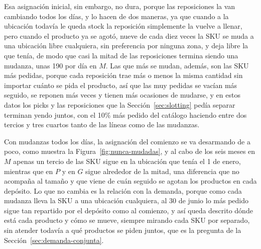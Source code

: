 Esa asignación inicial, sin embargo, no dura, porque las reposiciones la van cambiando todos los días, y lo hacen de dos maneras, ya que cuando a la ubicación todavía le queda stock la reposición simplemente la vuelve a llenar, pero cuando el producto ya se agotó, nueve de cada diez veces la SKU se muda a una ubicación libre cualquiera, sin preferencia por ninguna zona, y deja libre la que tenía, de modo que casi la mitad de las reposiciones termina siendo una mudanza, unas 190 por día en $M$.
Las que más se mudan, además, son las SKU más pedidas, porque cada reposición trae más o menos la misma cantidad sin importar cuánto se pida el producto, así que las muy pedidas se vacían más seguido, se reponen más veces y tienen más ocasiones de mudarse, y en estos datos los picks y las reposiciones que la Sección~\ref{sec:slotting} pedía separar terminan yendo juntos, con el 10\% más pedido del catálogo haciendo entre dos tercios y tres cuartos tanto de las líneas como de las mudanzas.

Con mudanzas todos los días, la asignación del comienzo se va desarmando de a poco, como muestra la Figura~\ref{fig:nunca-mudadas}, y al cabo de los seis meses en $M$ apenas un tercio de las SKU sigue en la ubicación que tenía el 1 de enero, mientras que en $P$ y en $G$ sigue alrededor de la mitad, una diferencia que no acompaña al tamaño y que viene de cuán seguido se agotan los productos en cada depósito.
Lo que no cambia es la relación con la demanda, porque como cada mudanza lleva la SKU a una ubicación cualquiera, al 30 de junio lo más pedido sigue tan repartido por el depósito como al comienzo, y así queda descrito dónde está cada producto y cómo se mueve, siempre mirando cada SKU por separado, sin atender todavía a qué productos se piden juntos, que es la pregunta de la Sección~\ref{sec:demanda-conjunta}.

